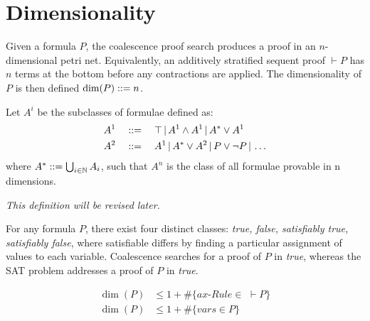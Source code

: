\section{Dimensionality}
    
    \begin{definition*}[Dimensionality]
        Given a formula $P$, the coalescence proof search produces a proof in an $n$-dimensional petri net.
        Equivalently, an additively stratified sequent proof $\vdash P$ has $n$ terms at the bottom before any contractions are applied.
        The dimensionality of $P$ is then defined $\dim(P) ::= n$.
    \end{definition*}

    \begin{example}
    \end{example}


    \begin{definition}\label{sec-ctr:formulae-classes}
        Let $A^i$ be the subclasses of formulae defined as:
        \begin{align*}
            A^1 \quad &::= \quad \top \,|\, A^1 \wedge A^1 \,|\, A^* \vee A^1 \\
            A^2 \quad &::= \quad A^1 \,|\, A^* \vee A^2 \,|\, P \vee \neg P \,|\, \ldots
        \end{align*}
        where $A^* ::= \bigcup_{i \in \mathbb{N}} A_i$, such that $A^n$ is the class of all formulae provable in n dimensions.

        \textit{This definition will be revised later.}
    \end{definition}


    \begin{remark*}
        For any formula $P$, there exist four distinct classes: \textit{true, false, satisfiably true, satisfiably false}, where satisfiable differs by finding a particular assignment of values to each variable.
        Coalescence searches for a proof of $P$ in \textit{true}, whereas the SAT problem addresses a proof of $P$ in \textit{true}.
    \end{remark*}
    
    
    \begin{proposition*}
        \begin{align*}
            \dim(P) &\leq 1 + \#\{ax\textit{-Rule} \in \,\, \vdash P\} \\
            \dim(P) &\leq 1 + \#\{vars \in P\}
        \end{align*}
    \end{proposition*}

